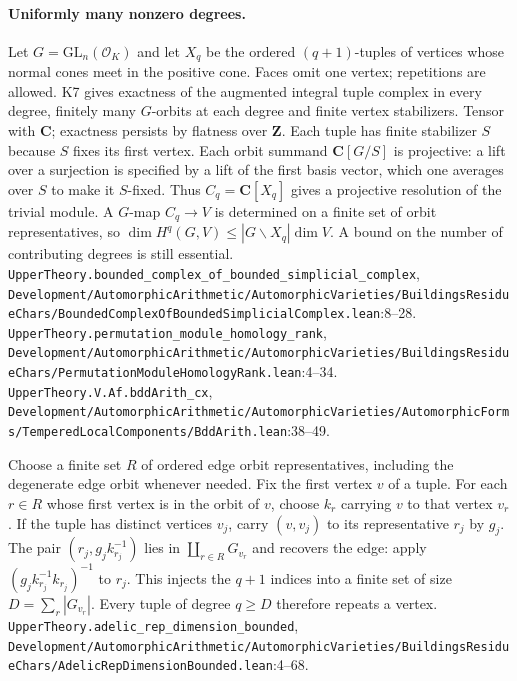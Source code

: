 \paragraph{Uniformly many nonzero degrees.}
Let $G=\mathrm{GL}_n(\mathcal O_K)$ and let $X_q$ be the ordered $(q+1)$-tuples of vertices whose normal cones meet in the positive cone. Faces omit one vertex; repetitions are allowed. K7 gives exactness of the augmented integral tuple complex in every degree, finitely many $G$-orbits at each degree and finite vertex stabilizers. Tensor with $\mathbf C$; exactness persists by flatness over $\mathbf Z$. Each tuple has finite stabilizer $S$ because $S$ fixes its first vertex. Each orbit summand $\mathbf C[G/S]$ is projective: a lift over a surjection is specified by a lift of the first basis vector, which one averages over $S$ to make it $S$-fixed. Thus $C_q=\mathbf C[X_q]$ gives a projective resolution of the trivial module. A $G$-map $C_q\to V$ is determined on a finite set of orbit representatives, so
$\dim H^q(G,V)\le |G\backslash X_q|\dim V$. A bound on the number of contributing degrees is still essential.
{\footnotesize\nolinkurl{UpperTheory.bounded_complex_of_bounded_simplicial_complex}, \nolinkurl{Development/AutomorphicArithmetic/AutomorphicVarieties/BuildingsResidueChars/BoundedComplexOfBoundedSimplicialComplex.lean}\allowbreak:8--28.} {\footnotesize\nolinkurl{UpperTheory.permutation_module_homology_rank}, \nolinkurl{Development/AutomorphicArithmetic/AutomorphicVarieties/BuildingsResidueChars/PermutationModuleHomologyRank.lean}\allowbreak:4--34.} {\footnotesize\nolinkurl{UpperTheory.V.Af.bddArith_cx}, \nolinkurl{Development/AutomorphicArithmetic/AutomorphicVarieties/AutomorphicForms/TemperedLocalComponents/BddArith.lean}\allowbreak:38--49.}

Choose a finite set $R$ of ordered edge orbit representatives, including the degenerate edge orbit whenever needed. Fix the first vertex $v$ of a tuple. For each $r\in R$ whose first vertex is in the orbit of $v$, choose $k_r$ carrying $v$ to that vertex $v_r$. If the tuple has distinct vertices $v_j$, carry $(v,v_j)$ to its representative $r_j$ by $g_j$. The pair $(r_j,g_jk_{r_j}^{-1})$ lies in $\coprod_{r\in R}G_{v_r}$ and recovers the edge: apply $(g_jk_{r_j}^{-1}k_{r_j})^{-1}$ to $r_j$. This injects the $q+1$ indices into a finite set of size $D=\sum_r |G_{v_r}|$. Every tuple of degree $q\ge D$ therefore repeats a vertex.
{\footnotesize\nolinkurl{UpperTheory.adelic_rep_dimension_bounded}, \nolinkurl{Development/AutomorphicArithmetic/AutomorphicVarieties/BuildingsResidueChars/AdelicRepDimensionBounded.lean}\allowbreak:4--68.}

